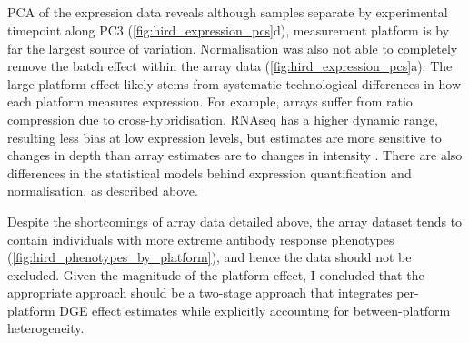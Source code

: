 \subsection{}

\gls{PCA} of the expression data reveals although samples separate by experimental timepoint along \gls{PC}3 (\cref{fig:hird_expression_pcs}d), measurement platform is by far the largest source of variation.
Normalisation was also not able to completely remove the batch effect within the array data (\cref{fig:hird_expression_pcs}a).
%
The large platform effect likely stems from systematic technological differences in how each platform measures expression.
For example, arrays suffer from ratio compression due to cross-hybridisation\autocite{draghici2006ReliabilityReproducibilityIssues}.
\gls{RNAseq} has a higher dynamic range, resulting less bias at low expression levels, but estimates are more sensitive to changes in depth than array estimates are to changes in intensity \autocite{robinson2015NestedParallelExperiment}.
There are also differences in the statistical models behind expression quantification and normalisation, as described above.

Despite the shortcomings of array data detailed above, the array dataset tends to contain individuals with more extreme antibody response phenotypes (\cref{fig:hird_phenotypes_by_platform}), and hence the data should not be excluded.
Given the magnitude of the platform effect, I concluded that the appropriate approach should be a two-stage approach that integrates per-platform \gls{DGE} effect estimates while explicitly accounting for between-platform heterogeneity.

